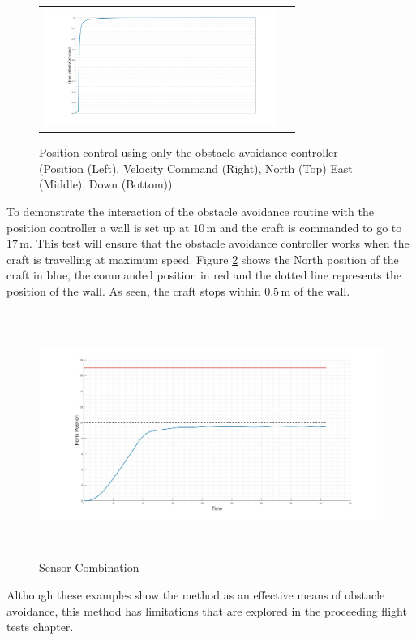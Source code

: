 \begin{figure}[H]
\begin{tabular}{c c}
				{\includegraphics[width = 3in]{../References/Diagrams/ObAvoidVelDown.jpg}}
			\end{tabular}
			\caption{Position control using only the obstacle avoidance controller (Position (Left), Velocity Command (Right), North (Top) East (Middle), Down (Bottom))}
			\label{IM_ObAvoidPos}
		\end{figure}
	
		To demonstrate the interaction of the obstacle avoidance routine with the position controller a wall is set up at $10$\,m and the craft is commanded to go to $17$\,m. This test will ensure that the obstacle avoidance controller works when the craft is travelling at maximum speed. Figure \ref{IM_ObAvoidTest1} shows the North position of the craft in blue, the commanded position in red and the dotted line represents the position of the wall. As seen, the craft stops within $0.5$\,m of the wall.
		
		\begin{figure}[H]
			\centering
			\includegraphics[height = 8cm]{../References/Testing/ObAvoidStraightWallNorth.jpg}     
			\caption{Sensor Combination}
			\label{IM_ObAvoidTest1}
		\end{figure}
					
		Although these examples show the method as an effective means of obstacle avoidance, this method has limitations that are explored in the proceeding flight tests chapter.
		
			